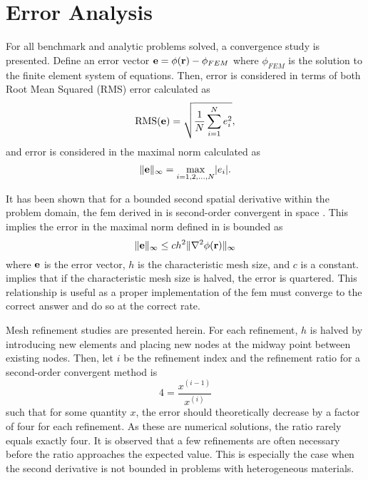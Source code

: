 \section{Error Analysis}
  For all benchmark and analytic problems solved, a convergence study is 
  presented. Define an error vector $\mathbf{e} = \phi(\mathbf{r}) - \phi_{FEM}$ where
  $\phi_{FEM}$ is the solution to the finite element system of equations. Then, 
  error is considered in terms of both Root Mean Squared (RMS) error calculated 
  as 
  \begin{equation} 
    \label{eq:rms}
    \text{RMS}(\mathbf{e}) = \sqrt{\frac{1}{N} \sum_{i=1}^{N} e_i^2},
  \end{equation}
  and error is considered in the maximal norm calculated as
  \begin{equation} 
    \label{eq:infnorm}
    \|\mathbf{e}\|_{\infty} = \max_{i=1,2,\ldots,N} \lvert e_i \rvert.
  \end{equation}

  It has been shown that for a bounded second spatial derivative 
  within the problem domain, the \gls{fem} derived in 
   is second-order convergent in space 
  \cite{textbookli}. This implies the error in the maximal norm defined in 
   is bounded as
  \begin{equation} 
    \label{eq:error_bound}
    \|\mathbf{e}\|_{\infty} \le c h^2 \| \mathbf{\nabla}^2 \phi(\mathbf{r}) \|_{\infty}
  \end{equation}
  where $\mathbf{e}$ is the error vector, $h$ is the characteristic mesh size, and $c$
  is a constant.  implies that if the characteristic mesh 
  size is halved, the error is quartered. This relationship is useful as a 
  proper implementation of the \gls{fem} must converge to the correct answer and 
  do so at the correct rate.
  
  Mesh refinement studies are presented herein. For each refinement, $h$ is 
  halved by introducing new elements and placing new nodes at the midway point
  between existing nodes. Then, let $i$ be the refinement index and the
  refinement ratio for a second-order convergent method is 
  \begin{equation}
    4 = \frac{x^{(i-1)}}{x^{(i)}}
  \end{equation}
  such that for some quantity $x$, the error should theoretically decrease by a
  factor of four for each refinement. As these are numerical solutions, the 
  ratio rarely equals exactly four. It is observed that a few refinements are 
  often necessary before the ratio approaches the expected value. This is 
  especially the case when the second derivative is not bounded in problems with 
  heterogeneous materials.
  
